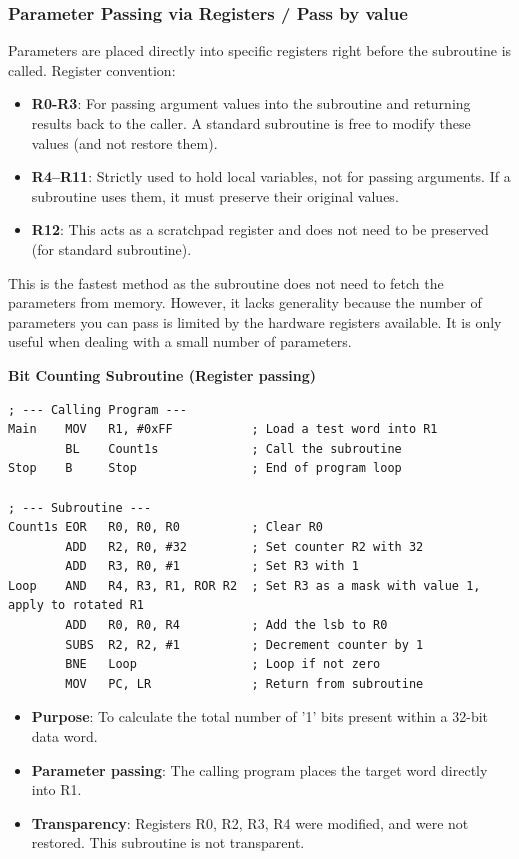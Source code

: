 \documentclass[../comorg-part1.tex]{subfiles}
\begin{document}
\noindent
\begin{minipage}{\textwidth}
\subsubsection{Parameter Passing via Registers / Pass by value}
Parameters are placed directly into specific registers right before the subroutine is called.\newline
Register convention:
\begin{itemize}
    \item \textbf{R0-R3}: For passing argument values into the subroutine and returning results back to the caller. A standard subroutine is free to modify these values (and not restore them).
    \item \textbf{R4–R11}: Strictly used to hold local variables, not for passing arguments. If a subroutine uses them, it must preserve their original values.
    \item \textbf{R12}: This acts as a scratchpad register and does not need to be preserved (for standard subroutine).
\end{itemize}
This is the fastest method as the subroutine does not need to fetch the parameters from memory.\newline
However, it lacks generality because the number of parameters you can pass is limited by the hardware registers available. It is only useful when dealing with a small number of parameters.

\noindent \textbf{Bit Counting Subroutine (Register passing)}
\begin{lstlisting}
; --- Calling Program ---
Main    MOV   R1, #0xFF           ; Load a test word into R1
        BL    Count1s             ; Call the subroutine
Stop    B     Stop                ; End of program loop

; --- Subroutine ---
Count1s EOR   R0, R0, R0          ; Clear R0
        ADD   R2, R0, #32         ; Set counter R2 with 32
        ADD   R3, R0, #1          ; Set R3 with 1
Loop    AND   R4, R3, R1, ROR R2  ; Set R3 as a mask with value 1, apply to rotated R1
        ADD   R0, R0, R4          ; Add the lsb to R0
        SUBS  R2, R2, #1          ; Decrement counter by 1
        BNE   Loop                ; Loop if not zero
        MOV   PC, LR              ; Return from subroutine
\end{lstlisting}    
\end{minipage}

\begin{itemize}
    \item \textbf{Purpose}: To calculate the total number of '1' bits present within a 32-bit data word.
    \item \textbf{Parameter passing}: The calling program places the target word directly into R1.
    \item \textbf{Transparency}: Registers R0, R2, R3, R4 were modified, and were not restored. This subroutine is not transparent.
\end{itemize}
\end{document}
